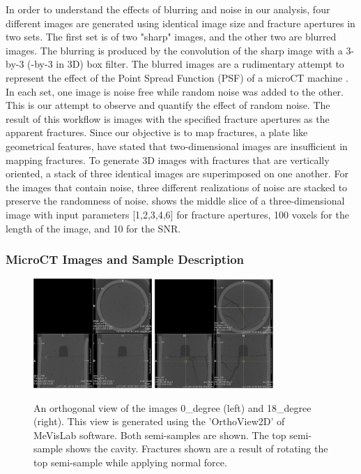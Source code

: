 \documentclass{edger}
\begin{document}
In order to understand the effects of blurring and noise in our analysis, four different images are generated using identical image size and fracture apertures in two sets. The first set is of two "sharp" images, and the other two are blurred images. The blurring is produced by the convolution of the sharp image with a 3-by-3 (-by-3 in 3D) box filter. The blurred images are a rudimentary attempt to represent the effect of the Point Spread Function (PSF) of a microCT machine \citep{Ketcham2010}. In each set, one image is noise free while random noise was added to the other. This is our attempt to observe and quantify the effect of random noise. The result of this workflow is images with the specified fracture apertures as the apparent fractures. Since our objective is to map fractures, a plate like geometrical features, \cite{Voorn2013} have stated that two-dimensional images are insufficient in mapping fractures.  To generate 3D images with fractures that are vertically oriented, a stack of three identical images are superimposed on one another. For the images that contain noise, three different realizations of noise are stacked to preserve the randomness of noise.  shows the middle slice of a three-dimensional image with input parameters [1,2,3,4,6] for fracture apertures, 100 voxels for the length of the image, and 10 for the SNR. 

\subsubsection{MicroCT Images and Sample Description}

\begin{figure}[!h]
\centering
\includegraphics[width=0.4\textwidth]{0_degreeOrthoView.png}
\includegraphics[width=0.4\textwidth]{18_degreeOrthoView.png}
\caption{An orthogonal view of the images 0\_degree (left) and 18\_degree (right). This view is generated using the 'OrthoView2D' of MeVisLab software. Both semi-samples are shown. The top semi-sample shows the cavity. Fractures shown are a result of rotating the top semi-sample while applying normal force. }
\label{fig:18Degree}
\end{figure}
\end{document}
